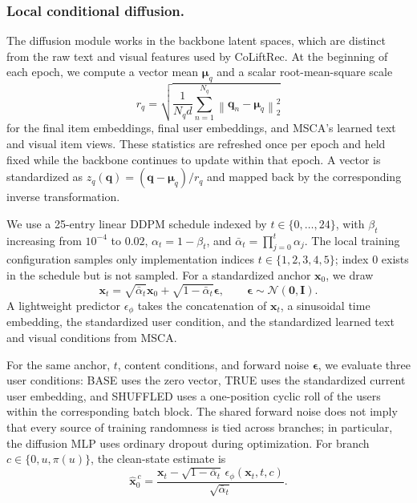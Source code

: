 \documentclass[sigconf,anonymous,review]{acmart}
\newcommand{\methodname}{CoLiftRec}
\begin{document}
\subsubsection{Local conditional diffusion.}
The diffusion module works in the backbone latent spaces, which are distinct from the raw text and visual features used by \methodname.
At the beginning of each epoch, we compute a vector mean $\boldsymbol{\mu}_q$ and a scalar root-mean-square scale
\begin{equation}
    r_q
    =
    \sqrt{
      \frac{1}{N_q d}
      \sum_{n=1}^{N_q}
      \left\|\mathbf{q}_n-\boldsymbol{\mu}_q\right\|_2^2
    }
\end{equation}
for the final item embeddings, final user embeddings, and MSCA's learned text and visual item views.
These statistics are refreshed once per epoch and held fixed while the backbone continues to update within that epoch.
A vector is standardized as
$z_q(\mathbf{q})=(\mathbf{q}-\boldsymbol{\mu}_q)/r_q$ and mapped back by the corresponding inverse transformation.

We use a 25-entry linear DDPM schedule indexed by $t\in\{0,\ldots,24\}$, with
$\beta_t$ increasing from $10^{-4}$ to $0.02$,
$\alpha_t=1-\beta_t$, and
$\bar\alpha_t=\prod_{j=0}^{t}\alpha_j$.
The local training configuration samples only implementation indices
$t\in\{1,2,3,4,5\}$; index $0$ exists in the schedule but is not sampled.
For a standardized anchor $\mathbf{x}_0$, we draw
\begin{equation}
    \mathbf{x}_t
    =
    \sqrt{\bar\alpha_t}\mathbf{x}_0
    +
    \sqrt{1-\bar\alpha_t}\boldsymbol{\epsilon},
    \qquad
    \boldsymbol{\epsilon}\sim\mathcal{N}(\mathbf{0},\mathbf{I}).
    \label{eq:qsample}
\end{equation}
A lightweight predictor $\epsilon_{\phi}$ takes the concatenation of $\mathbf{x}_t$, a sinusoidal time embedding, the standardized user condition, and the standardized learned text and visual conditions from MSCA.

For the same anchor, $t$, content conditions, and forward noise $\boldsymbol{\epsilon}$, we evaluate three user conditions:
BASE uses the zero vector, TRUE uses the standardized current user embedding, and SHUFFLED uses a one-position cyclic roll of the users within the corresponding batch block.
The shared forward noise does not imply that every source of training randomness is tied across branches; in particular, the diffusion MLP uses ordinary dropout during optimization.
For branch $c\in\{0,u,\pi(u)\}$, the clean-state estimate is
\begin{equation}
    \widehat{\mathbf{x}}_0^{\,c}
    =
    \frac{
      \mathbf{x}_t
      -
      \sqrt{1-\bar\alpha_t}\,
      \epsilon_{\phi}(\mathbf{x}_t,t,c)
    }{
      \sqrt{\bar\alpha_t}
    }.
    \label{eq:x0pred}
\end{equation}
\end{document}
